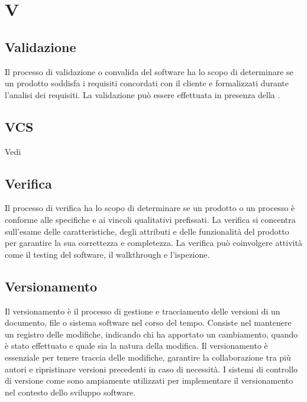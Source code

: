 \section{V}

\vspace{2em}
\subsection*{Validazione}
\par Il processo di validazione o convalida del software ha lo scopo di determinare se un prodotto soddisfa i requisiti concordati con il cliente e formalizzati durante l'analisi dei requisiti. La validazione può essere effettuata in presenza della .

\vspace{2em}
\subsection*{VCS}
\par Vedi 


\vspace{2em}
\subsection*{Verifica}
\par Il processo di verifica ha lo scopo di determinare se un prodotto o un processo è conforme alle specifiche e ai vincoli qualitativi prefissati. La verifica si concentra sull'esame delle caratteristiche, degli attributi e delle funzionalità del prodotto per garantire la sua correttezza e completezza. La verifica può coinvolgere attività come il testing del software, il walkthrough e l'ispezione.

\vspace{2em}
\subsection*{Versionamento}
\par Il versionamento è il processo di gestione e tracciamento delle versioni di un documento, file o sistema software nel corso del tempo. Consiste nel mantenere un registro delle modifiche, indicando chi ha apportato un cambiamento, quando è stato effettuato e quale sia la natura della modifica. Il versionamento è essenziale per tenere traccia delle modifiche, garantire la collaborazione tra più autori e ripristinare versioni precedenti in caso di necessità. I sistemi di controllo di versione come  sono ampiamente utilizzati per implementare il versionamento nel contesto dello sviluppo software.

